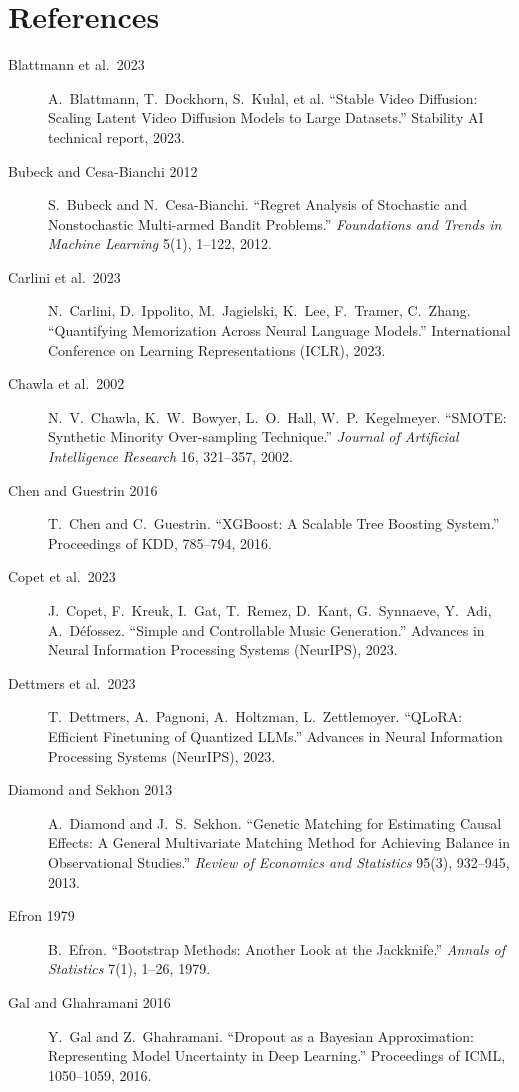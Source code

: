 \documentclass{article}
\begin{document}
\section*{References}
\label{sec:references}

\begin{description}
\item[Blattmann et al.\ 2023] A.\ Blattmann, T.\ Dockhorn, S.\ Kulal, et al. ``Stable Video Diffusion: Scaling Latent Video Diffusion Models to Large Datasets.'' Stability AI technical report, 2023.
\item[Bubeck and Cesa-Bianchi 2012] S.\ Bubeck and N.\ Cesa-Bianchi. ``Regret Analysis of Stochastic and Nonstochastic Multi-armed Bandit Problems.'' \emph{Foundations and Trends in Machine Learning} 5(1), 1--122, 2012.
\item[Carlini et al.\ 2023] N.\ Carlini, D.\ Ippolito, M.\ Jagielski, K.\ Lee, F.\ Tramer, C.\ Zhang. ``Quantifying Memorization Across Neural Language Models.'' International Conference on Learning Representations (ICLR), 2023.
\item[Chawla et al.\ 2002] N.\ V.\ Chawla, K.\ W.\ Bowyer, L.\ O.\ Hall, W.\ P.\ Kegelmeyer. ``SMOTE: Synthetic Minority Over-sampling Technique.'' \emph{Journal of Artificial Intelligence Research} 16, 321--357, 2002.
\item[Chen and Guestrin 2016] T.\ Chen and C.\ Guestrin. ``XGBoost: A Scalable Tree Boosting System.'' Proceedings of KDD, 785--794, 2016.
\item[Copet et al.\ 2023] J.\ Copet, F.\ Kreuk, I.\ Gat, T.\ Remez, D.\ Kant, G.\ Synnaeve, Y.\ Adi, A.\ D\'efossez. ``Simple and Controllable Music Generation.'' Advances in Neural Information Processing Systems (NeurIPS), 2023.
\item[Dettmers et al.\ 2023] T.\ Dettmers, A.\ Pagnoni, A.\ Holtzman, L.\ Zettlemoyer. ``QLoRA: Efficient Finetuning of Quantized LLMs.'' Advances in Neural Information Processing Systems (NeurIPS), 2023.
\item[Diamond and Sekhon 2013] A.\ Diamond and J.\ S.\ Sekhon. ``Genetic Matching for Estimating Causal Effects: A General Multivariate Matching Method for Achieving Balance in Observational Studies.'' \emph{Review of Economics and Statistics} 95(3), 932--945, 2013.
\item[Efron 1979] B.\ Efron. ``Bootstrap Methods: Another Look at the Jackknife.'' \emph{Annals of Statistics} 7(1), 1--26, 1979.
\item[Gal and Ghahramani 2016] Y.\ Gal and Z.\ Ghahramani. ``Dropout as a Bayesian Approximation: Representing Model Uncertainty in Deep Learning.'' Proceedings of ICML, 1050--1059, 2016.

\end{description}
\end{document}

